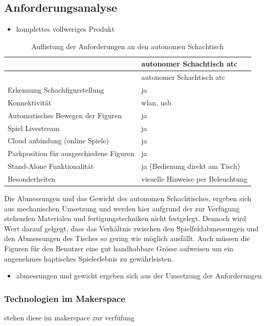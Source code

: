 \hypertarget{anforderungsanalyse}{%
\subsection{Anforderungsanalyse}\label{anforderungsanalyse}}

\begin{itemize}
\tightlist
\item
  komplettes vollweriges Produkt
\end{itemize}

\begin{longtable}[]{@{}ll@{}}
\caption{Auflistung der Anforderungen an den autonomen
Schachtisch}\tabularnewline
\toprule
& autonomer Schachtisch \gls{atc}\tabularnewline
\midrule
\endfirsthead
\toprule
& autonomer Schachtisch \gls{atc}\tabularnewline
\midrule
\endhead
Erkennung Schachfigurstellung & ja\tabularnewline
Konnektivität & \gls{wlan}, \gls{usb}\tabularnewline
Automatisches Bewegen der Figuren & ja\tabularnewline
Spiel Livestream & ja\tabularnewline
Cloud anbindung (online Spiele) & ja\tabularnewline
Parkposition für ausgeschiedene Figuren & ja\tabularnewline
Stand-Alone Funktionalität & ja (Bedienung direkt am
Tisch)\tabularnewline
Besonderheiten & visuelle Hinweise per Beleuchtung\tabularnewline
\bottomrule
\end{longtable}

Die Abmessungen und das Gewicht des autonomen Schachtisches, ergeben
sich aus mechanischen Umsetzung und werden hier aufgrund der zur
Verfügung stehenden Materialen und fertigungstechniken nicht festgelegt.
Dennoch wird Wert darauf gelgegt, dass das Verhältnis zwischen den
Spielfeldabmessungen und den Abmessungen des Tisches so gering wie
möglich ausfällt. Auch müssen die Figuren für den Benutzer eine gut
handhabbare Grösse aufweisen um ein angenehmes haptisches Spielerlebnis
zu gewährleisten.

\begin{itemize}
\tightlist
\item
  abmessungen und gewicht ergeben sich aus der Umsetzung der
  Anforderungen
\end{itemize}

\hypertarget{technologien-im-makerspace}{%
\subsubsection{Technologien im
Makerspace}\label{technologien-im-makerspace}}

stehen diese im makerspace zur verfüfung

